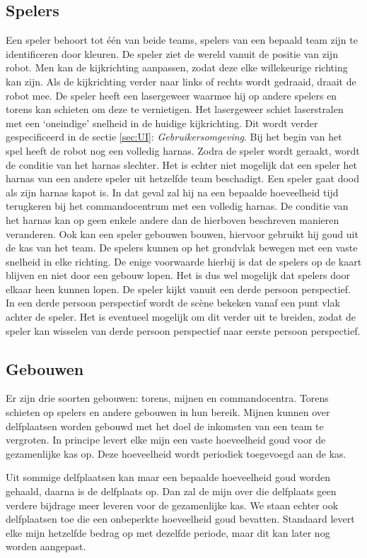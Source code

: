 \subsection{Spelers}
Een speler behoort tot \'e\'en van beide teams, spelers van een bepaald team zijn te identificeren door kleuren. De speler ziet de wereld vanuit de positie van zijn robot. Men kan de kijkrichting aanpassen, zodat deze elke willekeurige richting kan zijn. Als de kijkrichting verder naar links of rechts wordt gedraaid, draait de robot mee. De speler heeft een lasergeweer waarmee hij op andere spelers en torens kan schieten om deze te vernietigen. Het lasergeweer schiet laserstralen met een `oneindige' snelheid in de huidige kijkrichting. Dit wordt verder gespecificeerd in de sectie \ref{sec:UI}: \emph{Gebruikersomgeving}. Bij het begin van het spel heeft de robot nog een volledig harnas. Zodra de speler wordt geraakt, wordt de conditie van het harnas slechter. Het is echter niet mogelijk dat een speler het harnas van een andere speler uit hetzelfde team beschadigt.
\FloatBarrier
Een speler gaat dood als zijn harnas kapot is. In dat geval zal hij na een bepaalde hoeveelheid tijd terugkeren bij het commandocentrum met een volledig harnas. De conditie van het harnas kan op geen enkele andere dan de hierboven beschreven manieren veranderen. Ook kan een speler gebouwen bouwen, hiervoor gebruikt hij goud uit de kas van het team. De spelers kunnen op het grondvlak bewegen met een vaste snelheid in elke richting. De enige voorwaarde hierbij is dat de spelers op de kaart blijven en niet door een gebouw lopen. Het is dus wel mogelijk dat spelers door elkaar heen kunnen lopen. De speler kijkt vanuit een derde persoon perspectief. In een derde persoon perspectief wordt de sc\`ene bekeken vanaf een punt vlak achter de speler.
Het is eventueel mogelijk om dit verder uit te breiden, zodat de speler kan wisselen van derde persoon perspectief naar eerste persoon perspectief.

\subsection{Gebouwen}
Er zijn drie soorten gebouwen: torens, mijnen en commandocentra. Torens schieten op spelers en andere gebouwen in hun bereik. Mijnen kunnen over delfplaatsen worden gebouwd met het doel de inkomsten van een team te vergroten. In principe levert elke mijn een vaste hoeveelheid goud voor de gezamenlijke kas op. Deze hoeveelheid wordt periodiek toegevoegd aan de kas.

Uit sommige delfplaatsen kan maar een bepaalde hoeveelheid goud worden gehaald, daarna is de delfplaats op. Dan zal de mijn over die delfplaats geen verdere bijdrage meer leveren voor de gezamenlijke kas. We staan echter ook delfplaatsen toe die een onbeperkte hoeveelheid goud bevatten. Standaard levert elke mijn hetzelfde bedrag op met dezelfde periode, maar dit kan later nog worden aangepast.

